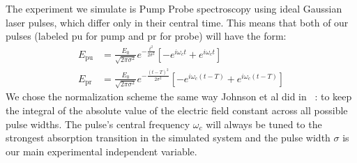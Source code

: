 The experiment we simulate is Pump Probe spectroscopy using ideal Gaussian laser pulses, which differ only in their central time.  This means that both of our pulses (labeled pu for pump and pr for probe) will have the form:
\begin{align}
	E_{\text{pu}} &= \frac{E_0}{\sqrt{2 \pi \sigma^2}} e^{-\frac{t^2}{2 \sigma^2} } \left[ -e^{i \omega_c t} + e^{i \omega_c t} \right]\\
	E_{\text{pr}} &= \frac{E_0}{\sqrt{2 \pi \sigma^2}} e^{-\frac{\left(t-T\right)^2}{2 \sigma^2} } \left[ -e^{i \omega_c \left(t-T\right)} + e^{i \omega_c \left(t-T\right)} \right]
\end{align}
We chose the normalization scheme the same way Johnson et al did in ~\cite{allanWitness}: to keep the integral of the absolute value of the electric field constant across all possible pulse widths.  The pulse's central frequency $\omega_c$ will always be tuned to the strongest absorption transition in the simulated system and the pulse width $\sigma$ is our main experimental independent variable.

